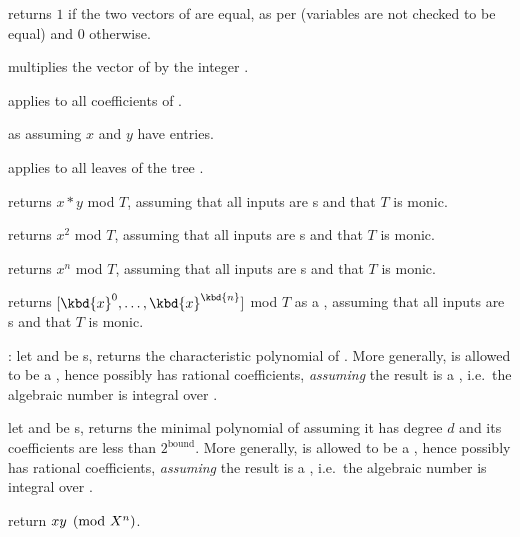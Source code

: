 
 returns $1$ if the two vectors of 
are equal, as per  (variables are not checked to be equal) and
$0$ otherwise.

 multiplies the vector of  
by the integer .

 applies  to all
coefficients of .

 as  assuming $x$
and $y$ have  entries.


 applies  to all
leaves of the tree .


 returns $x*y$ mod $T$, assuming
that all inputs are s and that $T$ is monic.

 returns $x^2$ mod $T$, assuming
that all inputs are s and that $T$ is monic.

 returns $x^n$ mod $T$, assuming
that all inputs are s and that $T$ is monic.

 returns $[\kbd{x}^0,
\dots, \kbd{x}^\kbd{n}]$ mod $T$ as a , assuming that all inputs are
s and that $T$ is monic.

: let  and  be
s, returns the characteristic polynomial of .
More generally,  is allowed to be a , hence possibly has
rational coefficients, \emph{assuming} the result is a , i.e.~the
algebraic number  is integral over .

let  and  be
s, returns the minimal polynomial of  assuming it has
degree $d$ and its coefficients are less than $2^{\text{bound}}$.
More generally,  is allowed to be a , hence possibly has
rational coefficients, \emph{assuming} the result is a , i.e.~the
algebraic number  is integral over .


 return $x\*y\pmod{X^n}$.

